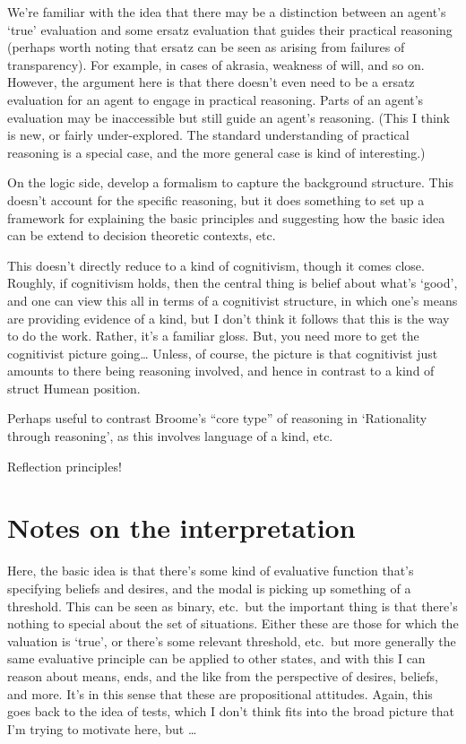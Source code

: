 \documentclass[10pt]{article}
\begin{document}
We're familiar with the idea that there may be a distinction between an agent's `true' evaluation and some ersatz evaluation that guides their practical reasoning (perhaps worth noting that ersatz can be seen as arising from failures of transparency).
For example, in cases of akrasia, weakness of will, and so on.
However, the argument here is that there doesn't even need to be a ersatz evaluation for an agent to engage in practical reasoning.
Parts of an agent's evaluation may be inaccessible but still guide an agent's reasoning.
{\color{red} (This I think is new, or fairly under-explored. The standard understanding of practical reasoning is a special case, and the more general case is kind of interesting.)}

On the logic side, develop a formalism to capture the background structure.
This doesn't account for the specific reasoning, but it does something to set up a framework for explaining the basic principles and suggesting how the basic idea can be extend to decision theoretic contexts, etc.


This doesn't directly reduce to a kind of cognitivism, though it comes close.
Roughly, if cognitivism holds, then the central thing is belief about what's `good', and one can view this all in terms of a cognitivist structure, in which one's means are providing evidence of a kind, but I don't think it follows that this is the way to do the work.
Rather, it's a familiar gloss.
But, you need more to get the cognitivist picture going\dots
Unless, of course, the picture is that cognitivist just amounts to there being reasoning involved, and hence in contrast to a kind of struct Humean position.

Perhaps useful to contrast Broome's ``core type'' of reasoning in `Rationality through reasoning', as this involves language of a kind, etc.

Reflection principles!


\section{Notes on the interpretation}
\label{sec:notes-interpretation}

Here, the basic idea is that there's some kind of evaluative function that's specifying beliefs and desires, and the modal is picking up something of a threshold.
This can be seen as binary, etc.\ but the important thing is that there's nothing to special about the set of situations.
Either these are those for which the valuation is `true', or there's some relevant threshold, etc.\ but more generally the same evaluative principle can be applied to other states, and with this I can reason about means, ends, and the like from the perspective of desires, beliefs, and more.
It's in this sense that these are propositional attitudes.
Again, this goes back to the idea of tests, which I don't think fits into the broad picture that I'm trying to motivate here, but \dots
\end{document}
